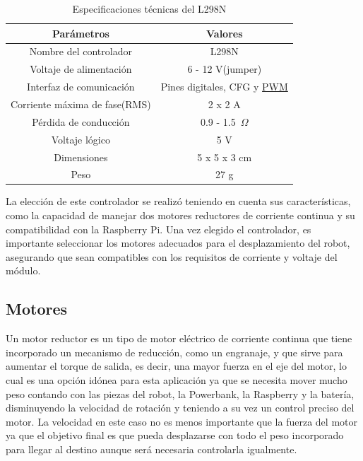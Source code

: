 \begin{table}[H]
\begin{center}
\begin{tabular}{|c|c|}
\hline
\textbf{Parámetros} & \textbf{Valores} \\
\hline
Nombre del controlador & L298N \\
Voltaje de alimentación & 6 - 12 V(jumper) \\
Interfaz de comunicación & Pines digitales, CFG y \hyperlink{PWM}{PWM} \\
Corriente máxima de fase(RMS) & 2 x 2 A \\
Pérdida de conducción & 0.9 - 1.5~$\Omega$ \\
Voltaje lógico & 5 V \\
Dimensiones & 5 x 5 x 3 cm \\
Peso & 27 g \\
\hline
\end{tabular}
\caption{Especificaciones técnicas del L298N}
\label{cuadro:ejemplo}
\end{center}
\end{table}

La elección de este controlador se realizó teniendo en cuenta sus características, como la capacidad de manejar dos motores reductores de corriente continua y su compatibilidad con la Raspberry Pi. Una vez elegido el controlador, es importante seleccionar los motores adecuados para el desplazamiento del robot, asegurando que sean compatibles con los requisitos de corriente y voltaje del módulo.

\subsection{Motores}
\label{subsec:motores}

Un motor reductor es un tipo de motor eléctrico de corriente continua que tiene incorporado un mecanismo de reducción, como un engranaje, y que sirve para aumentar el torque de salida, es decir, una mayor fuerza en el eje del motor, lo cual es una opción idónea para esta aplicación ya que se necesita mover mucho peso contando con las piezas del robot, la Powerbank, la Raspberry y la batería, disminuyendo la velocidad de rotación y teniendo a su vez un control preciso del motor. La velocidad en este caso no es menos importante que la fuerza del motor ya que el objetivo final es que pueda desplazarse con todo el peso incorporado para llegar al destino aunque será necesaria controlarla igualmente. \\

